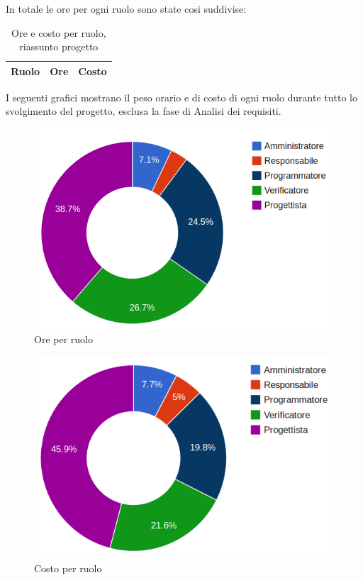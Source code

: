 In totale le ore per ogni ruolo sono state cosi suddivise:

\begin{table}[H]
	\centering
	\begin{tabular}{ l c c }
	\textbf{Ruolo} & \textbf{Ore} & \textbf{Costo} \\
	\hline
	
		
	
	\end{tabular}
	\caption{Ore e costo per ruolo, riassunto progetto}
	\end{table}

I seguenti grafici mostrano il peso orario e di costo di ogni ruolo durante tutto lo svolgimento del progetto, esclusa la fase di Analisi dei requisiti.

\begin{figure}[H]
\centering
\includegraphics[scale=0.35]{5-5-1.png}
\caption{Ore per ruolo\label{fig:nome}}
\end{figure}

\begin{figure}[H]
\centering
\includegraphics[scale=0.4]{5-5-2.png}
\caption{Costo per ruolo\label{fig:nome}}
\end{figure}
